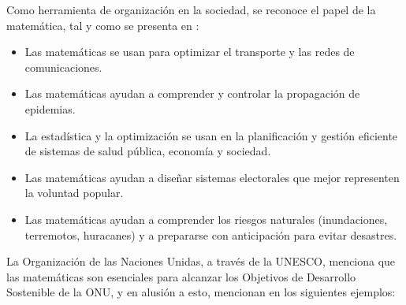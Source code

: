     Como herramienta de organización en la sociedad, se reconoce el papel de la matemática,
tal y como se presenta en \cite{UNESCO2020IDM}:

\begin{itemize}
    
     \color{blue} \item \color{black} Las matemáticas se usan para optimizar el transporte y las redes de comunicaciones.
    
    \color{blue} \item \color{black} Las matemáticas ayudan a comprender y controlar la propagación de epidemias. 
    
    \color{blue} \item \color{black} La estadística y la optimización se usan en la planificación y gestión eficiente de sistemas de salud pública, economía y sociedad. 
    
    \color{blue} \item \color{black} Las matemáticas ayudan a diseñar sistemas electorales que mejor representen la voluntad popular.   
    
    \color{blue} \item \color{black} Las matemáticas ayudan a comprender los riesgos naturales (inundaciones,  terremotos,
huracanes) y a prepararse con anticipación para evitar desastres.

\end{itemize}

La Organización de las Naciones Unidas, a través de la UNESCO, menciona que las matemáticas son esenciales para alcanzar los Objetivos de Desarrollo Sostenible de la ONU, y en alusión a esto, mencionan en \cite{UNESCO2020IDM} los siguientes ejemplos: 

